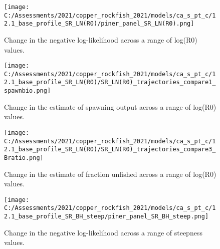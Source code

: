 \documentclass[11pt,
  english,
  a4paper,
]{article}
\begin{document}
\tagmcend\tagstructend

\newpage


\begin{figure}
\centering
\texttt{[image: C:/Assessments/2021/copper\_rockfish\_2021/models/ca\_s\_pt\_c/12.1\_base\_profile\_SR\_LN(R0)/piner\_panel\_SR\_LN(R0).png]}
\caption{Change in the negative log-likelihood across a range of log(R0) values.\label{fig:r0-profile}}
\end{figure}

\tagmcend\tagstructend


\begin{figure}
\centering
\texttt{[image: C:/Assessments/2021/copper\_rockfish\_2021/models/ca\_s\_pt\_c/12.1\_base\_profile\_SR\_LN(R0)/SR\_LN(R0)\_trajectories\_compare1\_spawnbio.png]}
\caption{Change in the estimate of spawning output across a range of log(R0) values.\label{fig:r0-ssb}}
\end{figure}

\tagmcend\tagstructend


\begin{figure}
\centering
\texttt{[image: C:/Assessments/2021/copper\_rockfish\_2021/models/ca\_s\_pt\_c/12.1\_base\_profile\_SR\_LN(R0)/SR\_LN(R0)\_trajectories\_compare3\_Bratio.png]}
\caption{Change in the estimate of fraction unfished across a range of log(R0) values.\label{fig:r0-depl}}
\end{figure}

\tagmcend\tagstructend


\begin{figure}
\centering
\texttt{[image: C:/Assessments/2021/copper\_rockfish\_2021/models/ca\_s\_pt\_c/12.1\_base\_profile\_SR\_BH\_steep/piner\_panel\_SR\_BH\_steep.png]}
\caption{Change in the negative log-likelihood across a range of steepness values.\label{fig:h-profile}}
\end{figure}
\end{document}
